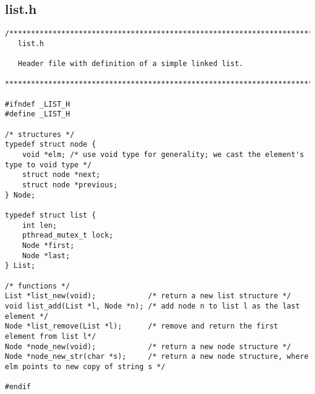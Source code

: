 \subsection{list.h}
\begin{lstlisting}
/******************************************************************************
   list.h 

   Header file with definition of a simple linked list.

******************************************************************************/

#ifndef _LIST_H
#define _LIST_H

/* structures */
typedef struct node {
	void *elm; /* use void type for generality; we cast the element's type to void type */
	struct node *next;
	struct node *previous;
} Node;

typedef struct list {
	int len;
	pthread_mutex_t lock;
	Node *first;
	Node *last;
} List;

/* functions */
List *list_new(void);            /* return a new list structure */
void list_add(List *l, Node *n); /* add node n to list l as the last element */
Node *list_remove(List *l);      /* remove and return the first element from list l*/
Node *node_new(void);            /* return a new node structure */
Node *node_new_str(char *s);     /* return a new node structure, where elm points to new copy of string s */

#endif
\end{lstlisting}
